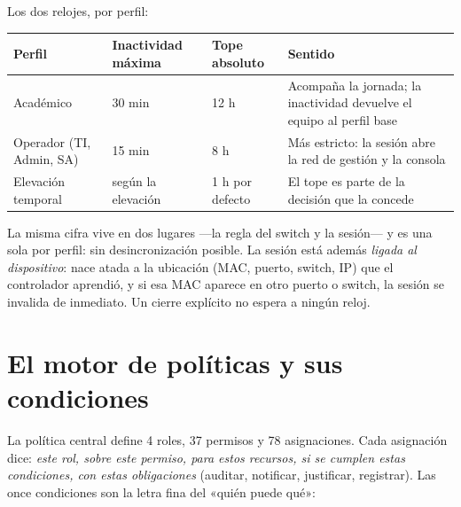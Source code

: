 \documentclass[11pt,a4paper]{article}
\begin{document}
Los dos relojes, por perfil:

\begin{longtable}{p{4.4cm}p{3.0cm}p{3.0cm}p{3.6cm}}
\toprule
\textbf{Perfil} & \textbf{Inactividad máxima} & \textbf{Tope absoluto} & \textbf{Sentido}\\
\midrule
Académico & 30 min & 12 h & Acompaña la jornada; la inactividad devuelve el equipo al perfil base\\
Operador (TI, Admin, SA) & 15 min & 8 h & Más estricto: la sesión abre la red de gestión y la consola\\
Elevación temporal & según la elevación & 1 h por defecto & El tope es parte de la decisión que la concede\\
\bottomrule
\end{longtable}

La misma cifra vive en dos lugares ---la regla del switch y la sesión--- y es una sola por perfil: sin desincronización posible. La sesión está además \emph{ligada al dispositivo}: nace atada a la ubicación (MAC, puerto, switch, IP) que el controlador aprendió, y si esa MAC aparece en otro puerto o switch, la sesión se invalida de inmediato. Un cierre explícito no espera a ningún reloj.

\section{El motor de políticas y sus condiciones}

La política central define 4 roles, 37 permisos y 78 asignaciones. Cada asignación dice: \emph{este rol, sobre este permiso, para estos recursos, si se cumplen estas condiciones, con estas obligaciones} (auditar, notificar, justificar, registrar). Las once condiciones son la letra fina del «quién puede qué»:
\end{document}
